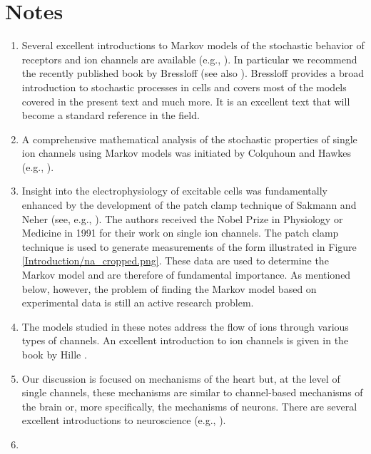 \section{Notes}
\begin{enumerate}
\item Several excellent introductions to Markov models of the stochastic behavior of receptors and ion channels are available (e.g., \cite{KeenerSneyd, Smith2002, Jacobs2010, Santillan2014}). In particular we recommend the recently published book by Bressloff \cite{Bressloff2014} (see also \cite{Bressloff2014w}). Bressloff \cite{Bressloff2014} provides a broad introduction to stochastic processes in cells and covers most of the models covered in the present text and much more. It is an excellent text that will become a standard reference in the field.
\item A comprehensive mathematical analysis of the stochastic properties of single ion channels using Markov models was initiated by Colquhoun and Hawkes (e.g., \cite{ Colquhoun1977,Colquhoun1981,Colquhoun1982}).
\item Insight into the electrophysiology of excitable cells was fundamentally enhanced by the development of the patch clamp technique of Sakmann and Neher (see, e.g., \cite{Sakmann1984,Sakmann1995}). The authors received the Nobel Prize in Physiology or Medicine in 1991 for their work on single ion channels. The patch clamp technique is used to generate measurements of the form illustrated in 
Figure \ref{Introduction/na_cropped.png}. These data are used to determine the Markov model and are therefore of fundamental importance. As mentioned below, however, the problem of finding the Markov model based on experimental data is still an active research problem.
\item The models studied in these notes address the flow of ions through various types of channels. An excellent introduction to ion channels is given in the book by Hille \cite{Hille2001}.
\item Our discussion is focused on mechanisms of the heart but, at the level of single channels, these mechanisms are similar to channel-based mechanisms of the brain or, more specifically, the mechanisms of neurons. There are several excellent introductions to neuroscience  
(e.g., \cite{Ermentrout2010,Sterratt2011,Dayan2001,Izhikevich2007}).
\item 

\end{enumerate}
